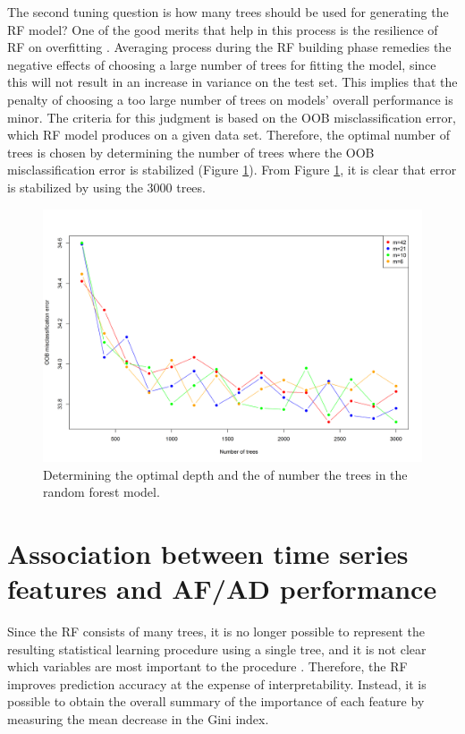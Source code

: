 \documentclass[preprint, 3p,
authoryear]{elsarticle} %
\begin{document}
The second tuning question is how many trees should be used for
generating the RF model? One of the good merits that help in this
process is the resilience of RF on overfitting
\citep{friedman2001elements}. Averaging process during the RF building
phase remedies the negative effects of choosing a large number of trees
for fitting the model, since this will not result in an increase in
variance on the test set. This implies that the penalty of choosing a
too large number of trees on models' overall performance is minor. The
criteria for this judgment is based on the OOB misclassification error,
which RF model produces on a given data set. Therefore, the optimal
number of trees is chosen by determining the number of trees where the
OOB misclassification error is stabilized (Figure \ref{fig:tree_depth}).
From Figure \ref{fig:tree_depth}, it is clear that error is stabilized
by using the 3000 trees.

\begin{figure}[H]

{\centering \includegraphics[width=0.9\linewidth]{img/300dpi/Fig_tree_depth_and_ntrees} 

}

\caption{Determining the optimal depth and the of number the trees in the random forest model.}\label{fig:tree_depth}
\end{figure}

\hypertarget{res}{%
\section{Association between time series features and AF/AD
performance}\label{res}}

Since the RF consists of many trees, it is no longer possible to
represent the resulting statistical learning procedure using a single
tree, and it is not clear which variables are most important to the
procedure \citep{james2013introduction}. Therefore, the RF improves
prediction accuracy at the expense of interpretability. Instead, it is
possible to obtain the overall summary of the importance of each feature
by measuring the mean decrease in the Gini index.
\end{document}
